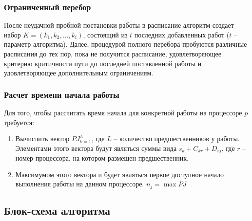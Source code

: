 \subsubsection*{Ограниченный перебор}
После неудачной пробной постановки работы в расписание алгоритм создает набор $K = \left( k_1, k_2, \dots, k_t \right)$, состоящий из $t$ последних добавленных работ ($t$ – параметр алгоритма). Далее, процедурой полного перебора пробуются различные расписания до тех пор, пока не получится расписание, удовлетворяющее критерию критичности пути до последней поставленной работы и удовлетворяющее дополнительным ограничениям.
\subsubsection*{Расчет времени начала работы}
Для того, чтобы рассчитать время начала  для конкретной работы на процессоре $p$ требуется:
\begin{enumerate}
    \item Вычислить вектор $PJ_{k=1}^L$, где $L$ – количество предшественников у работы. Элементами этого вектора будут являться суммы вида $s_k + C_{kr} + D_{rj}$, где $r$ – номер процессора, на котором размещен предшественник.
    \item Максимумом этого вектора и будет являться первое доступное начало выполнения работы на данном процессоре. $n_j=\max{PJ}$
\end{enumerate}

\subsection{Блок-схема алгоритма}
{\small
}